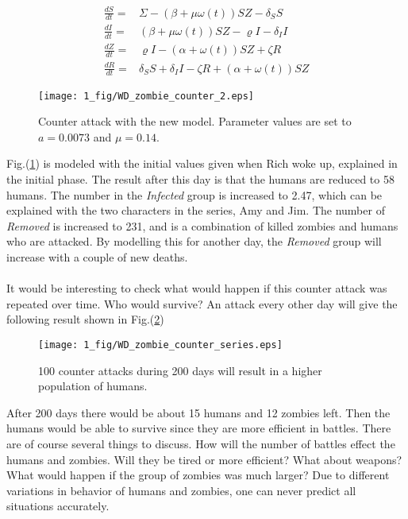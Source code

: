 \documentclass[%
twoside,                 %
final,                   %
chapterprefix=true,      %
open=right               %
10pt]{book}
\begin{document}
\begin{align*} \label{eq:seland_model}
\frac{dS}{dt} =& \Sigma -(\beta+\mu \omega(t))SZ - \delta_SS \\
\frac{dI}{dt} =& (\beta+\mu \omega(t))SZ - \varrho I - \delta_II\\
\frac{dZ}{dt} =& \varrho I- (\alpha+\omega(t))SZ + \zeta R\\
\frac{dR}{dt} =& \delta_SS +\delta_II -\zeta R + (\alpha+\omega(t))SZ 
\end{align*}


\begin{figure}[ht]
  \centerline{\texttt{[image: 1\_fig/WD\_zombie\_counter\_2.eps]}}
  \caption{
  \label{fig:zombie_counter_2} Counter attack with the new model. Parameter values are set to $a=0.0073$ and $\mu=0.14$.
  }
\end{figure}


Fig.(\ref{fig:zombie_counter_2}) is modeled with the initial values given when Rich woke up, explained in the initial phase. The result after this day is that the humans are reduced to 58 humans. The number in the \emph{Infected} group is increased to 2.47, which can be explained with the two characters in the series, Amy and Jim. The number of \emph{Removed} is increased to 231, and is a combination of killed zombies and humans who are attacked. By modelling this for another day, the \emph{Removed} group will increase with a couple of new deaths. 
\\
\\
It would be interesting to check what would happen if this counter attack was repeated over time. Who would survive? An attack every other day will give the following result shown in Fig.(\ref{fig:counter_series})


\begin{figure}[ht]
  \centerline{\texttt{[image: 1\_fig/WD\_zombie\_counter\_series.eps]}}
  \caption{
  \label{fig:counter_series} 100 counter attacks during 200 days will result in a higher population of humans.
  }
\end{figure}


After 200 days there would be about 15 humans and 12 zombies left. Then the humans would be able to survive since they are more efficient in battles. There are of course several things to discuss. How will the number of battles effect the humans and zombies. Will they be tired or more efficient? What about weapons? What would happen if the group of zombies was much larger? Due to different variations in behavior of humans and zombies, one can never predict all situations accurately. 
\end{document}
